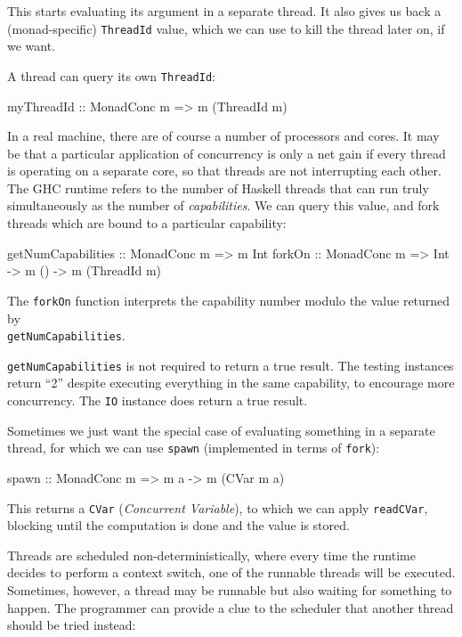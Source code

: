 This starts evaluating its argument in a separate thread. It also
gives us back a (monad-specific) \verb|ThreadId| value, which we can
use to kill the thread later on, if we want.

A thread can query its own \verb|ThreadId|:

\begin{haskellcode}
myThreadId :: MonadConc m => m (ThreadId m)
\end{haskellcode}

In a real machine, there are of course a number of processors and
cores. It may be that a particular application of concurrency is only
a net gain if every thread is operating on a separate core, so that
threads are not interrupting each other. The GHC runtime refers to the
number of Haskell threads that can run truly simultaneously as the
number of \emph{capabilities}. We can query this value, and fork
threads which are bound to a particular capability:

\begin{haskellcode}
getNumCapabilities :: MonadConc m => m Int
forkOn :: MonadConc m => Int -> m () -> m (ThreadId m)
\end{haskellcode}

The \verb|forkOn| function interprets the capability number modulo the
value returned by \\\verb|getNumCapabilities|.

\begin{departure}
  \verb|getNumCapabilities| is not required to return a true
  result. The testing instances return ``2'' despite executing
  everything in the same capability, to encourage more
  concurrency. The \verb|IO| instance does return a true result.
\end{departure}

Sometimes we just want the special case of evaluating something in a
separate thread, for which we can use \verb|spawn| (implemented in
terms of \verb|fork|):

\begin{haskellcode}
spawn :: MonadConc m => m a -> m (CVar m a)
\end{haskellcode}

This returns a \verb|CVar| (\emph{Concurrent Variable}), to which we
can apply \verb|readCVar|, blocking until the computation is done and
the value is stored.

Threads are scheduled non-deterministically, where every time the
runtime decides to perform a context switch, one of the runnable
threads will be executed. Sometimes, however, a thread may be runnable
but also waiting for something to happen. The programmer can provide a
clue to the scheduler that another thread should be tried instead:

